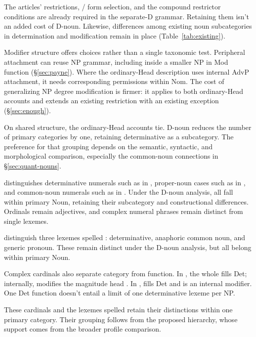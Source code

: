 \documentclass[12pt]{article}
\begin{document}
The articles' restrictions, / form selection, and the compound restrictor conditions are already required in the separate-D grammar. Retaining them isn't an added cost of D-noun. Likewise, differences among existing noun subcategories in determination and modification remain in place (Table~\ref{tab:existing}).

Modifier structure offers choices rather than a single taxonomic test. Peripheral attachment can reuse NP grammar, including inside a smaller NP in Mod function (§\ref{sec:payne}). Where the ordinary-Head description uses internal AdvP attachment, it needs corresponding permissions within Nom. The cost of generalizing NP degree modification is firmer: it applies to both ordinary-Head accounts and extends an existing restriction with an existing  exception (§\ref{sec:enough}).

On shared structure, the ordinary-Head accounts tie. D-noun reduces the number of primary categories by one, retaining determinative as a subcategory. The preference for that grouping depends on the semantic, syntactic, and morphological comparison, especially the common-noun connections in §\ref{sec:quant-nouns}.

\textcite{reynolds2026numerals} distinguishes determinative numerals such as  in , proper-noun cases such as  in , and common-noun numerals such as  in . Under the D-noun analysis, all fall within primary Noun, retaining their subcategory and constructional differences. Ordinals remain adjectives, and complex numeral phrases remain distinct from single lexemes.

\textcite[797--798]{payne2013anaphoric} distinguish three lexemes spelled : determinative, anaphoric common noun, and generic pronoun. These remain distinct under the D-noun analysis, but all belong within primary Noun.

Complex cardinals also separate category from function. In , the whole  fills Det; internally,  modifies the magnitude head  \citep[§4]{reynolds2026numerals}. In ,  fills Det and  is an internal modifier. One Det function doesn't entail a limit of one determinative lexeme per NP.

These cardinals and the lexemes spelled  retain their distinctions within one primary category. Their grouping follows from the proposed hierarchy, whose support comes from the broader profile comparison.
\end{document}

